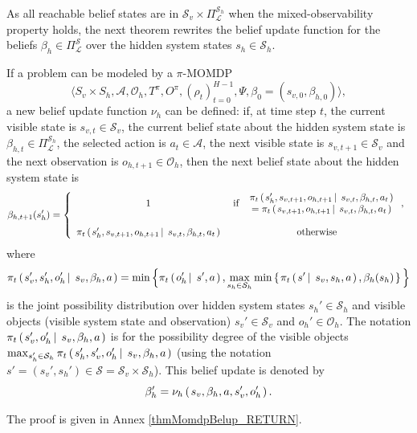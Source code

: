 As all reachable belief states are in $\mathcal{S}_v \times \Pi^{\mathcal{S}_h}_{\mathcal{L}}$
when the mixed-observability property holds, 
the next theorem rewrites the belief update function for the beliefs 
$\beta_h \in \Pi^{\mathcal{S}}_{\mathcal{L}}$ over the hidden system states $s_h \in \mathcal{S}_h$.
\begin{theorem}
\label{thmMomdpBelup}
If a problem can be modeled by a $\pi$-MOMDP  
\[ \Big\langle S_v \times S_h, \mathcal{A}, \mathcal{O}_h, T^{\pi}, O^{\pi}, (\rho_t)_{t=0}^{H-1}, \Psi, \beta_0 = (s_{v,0}, \beta_{h,0})  \Big\rangle, \]
a new belief update function $\nu_h$ can be defined:
if, at time step $t$, 
the current visible state is $s_{v,t} \in \mathcal{S}_v$,
the current belief state about the hidden system state is $\beta_{h,t} \in \Pi^{\mathcal{S}_h}_{\mathcal{L}}$,
the selected action is $a_t \in \mathcal{A}$,
the next visible state is $s_{v,t+1} \in \mathcal{S}_v$
and the next observation is $o_{h,t+1} \in \mathcal{O}_h$,
then the next belief state about the hidden system state is
\begin{equation}
\label{equation_piMOMDPupdate}
\beta_{h,t+1}(s_h') = \left \{ \begin{array}{ccc}
1 & \mbox{ if } \left. \begin{array}{cc} \pi_t \left( \left.  s_h', s_{v,t+1}, o_{h,t+1} \, \right| \left. \, s_{v,t}, \beta_{h,t}, a_t  \right. \right) \\
	 	= \pi_t \left( \left. s_{v,t+1}, o_{h,t+1} \, \right| \left. \, s_{v,t}, \beta_{h,t}, a_t  \right. \right)
		\end{array} \right., \\
\\
\pi_t \left( \left.  s_h', s_{v,t+1}, o_{h,t+1} \, \right| \left. \, s_{v,t}, \beta_{h,t}, a_t  \right. \right) & \mbox{ otherwise } 
\end{array} \right. 
\end{equation}
where 
\[ \pi_t \left( \left. s_v',  s_h', o_h' \, \right| \left. \, s_v, \beta_h, a  \right. \right) = \min \Big\{ \pi_t \left( \left.  o_h' \, \right| \left. \, s', a   \right. \right), \max_{s_h \in \mathcal{S}_h} \min \left\{ \left.  \pi_t \left( \left. s' \, \right| \left. \, s_v,s_h, a \right. \right), \beta_h(s_h)   \right. \right\} \Big\} \] 
is the joint possibility distribution over hidden system states $s_h' \in \mathcal{S}_h$ 
and visible objects (visible system state and observation) $s_v' \in \mathcal{S}_v$ and $o_h' \in \mathcal{O}_h$.
The notation $\pi_t \left( \left.  s_v', o_h' \, \right| \left. \, s_v, \beta_h, a  \right. \right)$ 
is for the possibility degree of the visible objects
$\max_{s_h' \in \mathcal{S}_h} \pi_t \left( \left.  s_h', s_v', o_h' \, \right| \left. \, s_v, \beta_h, a  \right. \right)$
(using the notation $s' = (s_v', s_h') \in \mathcal{S} = \mathcal{S}_v \times \mathcal{S}_h$). 
This belief update is denoted by \[ \beta_h' = \nu_h \left( \left.  s_v, \beta_h, a, s_v', o_h'  \right. \right). \]
\end{theorem}
The proof is given in Annex \ref{thmMomdpBelup_RETURN}.

